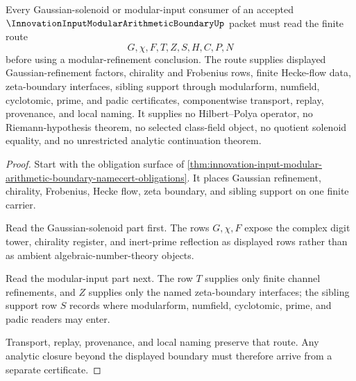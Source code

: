 \begin{theorem}
\label{thm:innovation-input-modular-arithmetic-boundary-gaussian-solenoid-route}
Every Gaussian-solenoid or modular-input consumer of an accepted $\InnovationInputModularArithmeticBoundaryUp$ packet must read the finite route
$$
G,\chi,F,T,Z,S,H,C,P,N
$$
before using a modular-refinement conclusion. The route supplies displayed Gaussian-refinement factors, chirality and Frobenius rows, finite Hecke-flow data, zeta-boundary interfaces, sibling support through modularform, numfield, cyclotomic, prime, and padic certificates, componentwise transport, replay, provenance, and local naming. It supplies no Hilbert--Polya operator, no Riemann-hypothesis theorem, no selected class-field object, no quotient solenoid equality, and no unrestricted analytic continuation theorem.
\end{theorem}
\begin{proof}
Start with the obligation surface of \autoref{thm:innovation-input-modular-arithmetic-boundary-namecert-obligations}. It places Gaussian refinement, chirality, Frobenius, Hecke flow, zeta boundary, and sibling support on one finite carrier.

Read the Gaussian-solenoid part first. The rows $G,\chi,F$ expose the complex digit tower, chirality register, and inert-prime reflection as displayed rows rather than as ambient algebraic-number-theory objects.

Read the modular-input part next. The row $T$ supplies only finite channel refinements, and $Z$ supplies only the named zeta-boundary interfaces; the sibling support row $S$ records where modularform, numfield, cyclotomic, prime, and padic readers may enter.

Transport, replay, provenance, and local naming preserve that route. Any analytic closure beyond the displayed boundary must therefore arrive from a separate certificate.
\end{proof}



